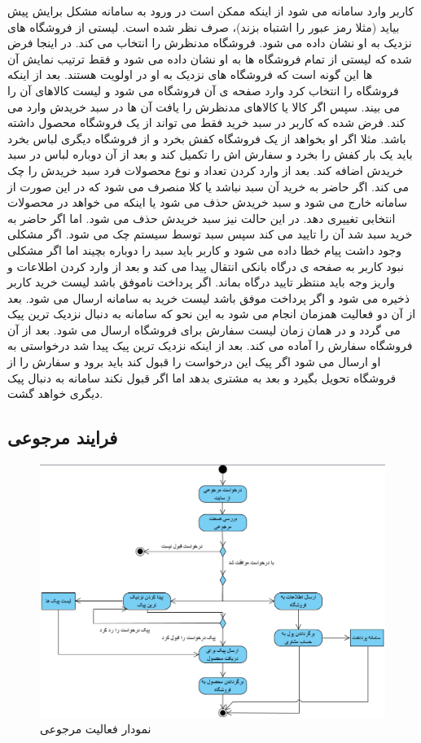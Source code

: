 \documentclass[12pt,a4paper]{article}
\begin{document}
	
	کاربر وارد سامانه می شود از اینکه ممکن است در ورود به سامانه مشکل برایش پیش بیاید (مثلا رمز عبور را اشتباه بزند)، صرف نظر شده است. لیستی از فروشگاه های نزدیک به او نشان داده می شود. فروشگاه مدنظرش را انتخاب می کند. در اینجا فرض شده که لیستی از تمام فروشگاه ها به او نشان داده می شود و فقط ترتیب نمایش آن ها این گونه است که فروشگاه های نزدیک به او در اولویت هستند. بعد از اینکه فروشگاه را انتخاب کرد وارد صفحه ی آن فروشگاه می شود و لیست کالاهای آن را می بیند. سپس اگر کالا یا کالاهای مدنظرش را یافت آن ها در سبد خریدش وارد می کند. فرض شده که کاربر در سبد خرید فقط می تواند از یک فروشگاه محصول داشته باشد. مثلا اگر او بخواهد از یک فروشگاه کفش بخرد و از فروشگاه دیگری لباس بخرد باید یک بار کفش را بخرد و سفارش اش را تکمیل کند و بعد از آن دوباره لباس در سبد خریدش اضافه کند. بعد از وارد کردن تعداد و نوع محصولات فرد سبد خریدش را چک می کند. اگر حاضر به خرید آن سبد نباشد یا کلا منصرف می شود که در این صورت از سامانه خارج می شود و سبد خریدش حذف می شود یا اینکه می خواهد در محصولات انتخابی تغییری دهد. در این حالت نیز سبد خریدش حذف می شود. اما اگر حاضر به خرید سبد شد آن را تایید می کند سپس سبد توسط سیستم چک می شود. اگر مشکلی وجود داشت پیام خطا داده می شود و کاربر باید سبد را دوباره بچیند اما اگر مشکلی نبود کاربر به صفحه ی درگاه بانکی انتقال پیدا می کند و بعد از وارد کردن اطلاعات و واریز وجه باید منتظر تایید درگاه بماند. اگر پرداخت ناموفق باشد لیست خرید کاربر ذخیره می شود و اگر پرداخت موفق باشد لیست خرید به سامانه ارسال می شود. بعد از آن دو فعالیت همزمان انجام می شود به این نحو که سامانه به دنبال نزدیک ترین پیک می گردد و در همان زمان لیست سفارش برای فروشگاه ارسال می شود. بعد از آن فروشگاه سفارش را آماده می کند. بعد از اینکه نزدیک ترین پیک پیدا شد درخواستی به او ارسال می شود اگر پیک این درخواست را قبول کند باید برود و سفارش را از فروشگاه تحویل بگیرد و بعد به مشتری بدهد اما اگر قبول نکند سامانه به دنبال پیک دیگری خواهد گشت.
	
	\pagebreak		
	\subsection{فرایند مرجوعی} \label{section.activity.return}
		\begin{figure}[h!]
			\begin{center}
				\includegraphics[width=14cm]{images/Return Activity Diagram.png}
			\end{center}
			\caption{نمودار فعالیت مرجوعی}
		\end{figure}
		
\end{document}
